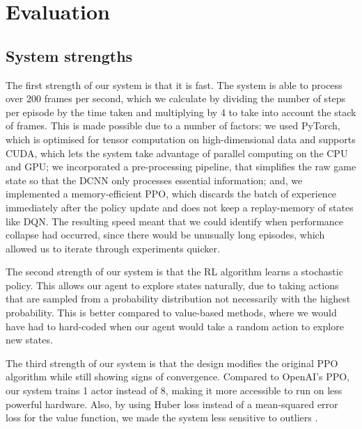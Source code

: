\documentclass[12pt,a4paper]{article}
\begin{document}
\section{Evaluation}
\subsection{System strengths} 
The first strength of our system is that it is fast. The system is able to process over 200 frames per second, which we calculate by dividing the number of steps per episode by the time taken and multiplying by 4 to take into account the stack of frames. This is made possible due to a number of factors: we used PyTorch, which is optimised for tensor computation on high-dimensional data and supports CUDA, which lets the system take advantage of parallel computing on the CPU and GPU; we incorporated a pre-processing pipeline, that simplifies the raw game state so that the DCNN only processes essential information; and, we implemented a memory-efficient PPO, which discards the batch of experience immediately after the policy update and does not keep a replay-memory of states like DQN. The resulting speed meant that we could identify when performance collapse had occurred, since there would be unusually long episodes, which allowed us to iterate through experiments quicker. 

The second strength of our system is that the RL algorithm learns a stochastic policy. This allows our agent to explore states naturally, due to taking actions that are sampled from a probability distribution not necessarily with the highest probability. This is better compared to value-based methods, where we would have had to hard-coded when our agent would take a random action to explore new states. 

The third strength of our system is that the design modifies the original PPO algorithm while still showing signs of convergence. Compared to OpenAI's PPO, our system trains 1 actor instead of 8, making it more accessible to run on less powerful hardware. Also, by using Huber loss instead of a mean-squared error loss for the value function, we made the system less sensitive to outliers \cite{DBLP:journals/corr/Girshick15}.
\end{document}
